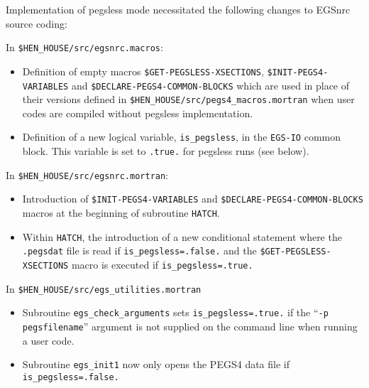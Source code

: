 Implementation of pegsless mode necessitated the following changes to EGSnrc source coding:
\begin{description}
\item In {\tt \$HEN\_HOUSE/src/egsnrc.macros}:
\begin{itemize}
\item Definition of empty macros {\tt \$GET-PEGSLESS-XSECTIONS}, {\tt \$INIT-PEGS4-VARIABLES} and {\tt \$DECLARE-PEGS4-COMMON-BLOCKS}
which are used in place of their versions defined in {\tt \$HEN\_HOUSE/src/pegs4\_macros.mortran} when user codes are compiled
without pegsless implementation.
\item Definition of a new logical variable, {\tt is\_pegsless}, in the {\tt EGS-IO} common block.  This variable is set to {\tt .true.}
for pegsless runs (see below).
\end{itemize}
\item In {\tt \$HEN\_HOUSE/src/egsnrc.mortran}:
\begin{itemize}
\item Introduction of {\tt \$INIT-PEGS4-VARIABLES} and {\tt \$DECLARE-PEGS4-COMMON-BLOCKS} macros at the beginning of
subroutine {\tt HATCH}.
\item Within {\tt HATCH}, the introduction of a new conditional statement where
the {\tt .pegsdat} file is read if {\tt is\_pegsless=.false.} and the {\tt \$GET-PEGSLESS-XSECTIONS} macro
is executed if {\tt is\_pegsless=.true.}
\end{itemize}
\item In {\tt \$HEN\_HOUSE/src/egs\_utilities.mortran}
\begin{itemize}
\item Subroutine {\tt egs\_check\_arguments} sets {\tt is\_pegsless=.true.} if the
``{\tt -p pegsfilename}'' argument is not supplied on the command line when running a user code.
\item Subroutine {\tt egs\_init1} now only opens the PEGS4 data file if {\tt is\_pegsless=.false.}
\end{itemize}
\end{description}

